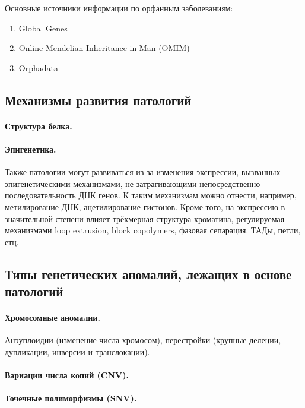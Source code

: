\documentclass[a4paper,12pt]{article}
\begin{document}
Основные источники информации по орфанным заболеваниям:

\begin{enumerate}
\item Global Genes
\item Online Mendelian Inheritance in Man (OMIM)\cite{omim}
\item Orphadata
\end{enumerate}

\subsection{Механизмы развития патологий}

\paragraph{Структура белка.}

\paragraph{Эпигенетика.}
Также патологии могут развиваться из-за изменения экспрессии, вызванных эпигенетическими механизмами, не затрагивающими непосредственно последовательность ДНК генов.
К таким механизмам можно отнести, например, метилирование ДНК, ацетилирование гистонов.
Кроме того, на экспрессию в значительной степени влияет трёхмерная структура хроматина, регулируемая механизмами loop extrusion, block copolymers, фазовая сепарация.
ТАДы, петли, етц.

\subsection{Типы генетических аномалий, лежащих в основе патологий}

\paragraph{Хромосомные аномалии.}
Анэуплоидии (изменение числа хромосом), перестройки (крупные делеции, дупликации, инверсии и транслокации).

\paragraph{Вариации числа копий (CNV).}

\paragraph{Точечные полиморфизмы (SNV).}
\end{document}
